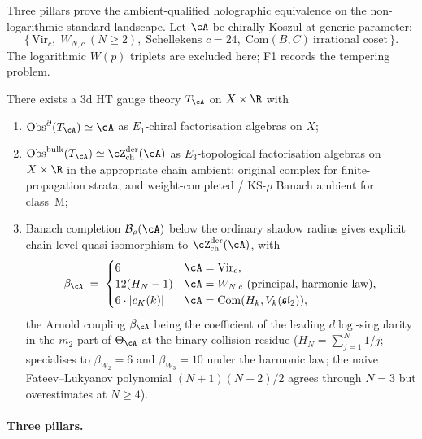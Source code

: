Three pillars prove the ambient-qualified holographic equivalence on
the non-logarithmic standard landscape. Let $\cA$ be chirally Koszul
at generic parameter:
\[
\{\,\mathrm{Vir}_c,\; W_{N, c}\ (N \ge 2),\;
 \text{Schellekens } c = 24,\;
 \mathrm{Com}(B, C)\ \text{irrational coset}\,\}.
\]
The logarithmic $W(p)$ triplets are excluded here; F1 records the
tempering problem.

\begin{maintheorem}
\label{thm:intro-programme-climax}
There exists a 3d HT gauge theory $T_\cA$ on
$X \times \R$ with
\begin{enumerate}[label=\textup{(\roman*)}]
\item $\mathrm{Obs}^\partial(T_\cA) \simeq \cA$ as
 $E_1$-chiral factorisation algebras on $X$;
\item $\mathrm{Obs}^{\mathrm{bulk}}(T_\cA) \simeq
 \cZ^{\mathrm{der}}_{\mathrm{ch}}(\cA)$ as $E_3$-topological
 factorisation algebras on $X \times \R$ in the appropriate chain
 ambient: original complex for finite-propagation strata, and
 weight-completed / KS-$\rho$ Banach ambient for class~M;
\item Banach completion $\mathcal{B}_\rho(\cA)$ below the ordinary
 shadow radius gives explicit chain-level
 quasi-isomorphism to $\cZ^{\mathrm{der}}_{\mathrm{ch}}(\cA)$,
 with
 \[
 \beta_\cA \;=\;
\begin{cases}
6 & \cA = \mathrm{Vir}_c, \\
12(H_N - 1) & \cA = W_{N, c}\ \text{(principal, harmonic law)}, \\
6 \cdot |c_K(k)| & \cA = \mathrm{Com}(H_k, V_k(\mathfrak{sl}_2)),
\end{cases}
\]
 the Arnold coupling $\beta_\cA$ being the coefficient of the
 leading $d\log$-singularity in the $m_2$-part of $\Theta_\cA$ at
 the binary-collision residue
($H_N = \sum_{j=1}^N 1/j$; specialises to $\beta_{W_2} = 6$ and
$\beta_{W_3} = 10$ under the harmonic law; the naive
Fateev--Lukyanov polynomial
$(N+1)(N+2)/2$ agrees through $N = 3$ but overestimates at
 $N \ge 4$).
\end{enumerate}
\end{maintheorem}

\paragraph{Three pillars.}

